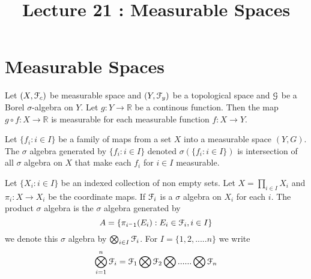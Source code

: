 \documentclass[a4paper,english,12pt]{article}
\title{Lecture 21 : Measurable Spaces}
\author{}
\begin{document}
\maketitle

\section{Measurable Spaces}
\begin{cor}
Let $(X,\mathcal{F}_c)$ be measurable space and $(Y,\mathcal{F}_y)$ be a topological space and $\mathcal{G}$ be a Borel $\sigma$-algebra on $Y$. Let $g : Y \longrightarrow \mathbb{R}$ be a continous function. Then the map $ g \circ f : X \longrightarrow \mathbb{R}$ is measurable for each measurable function $f : X \longrightarrow Y$.
\end{cor}
	
\begin{defn} %
Let $\{f_i : i \in I\}$ be a family of maps from a set $X$ into a measurable space $(Y,G)$. The $\sigma$ algebra generated by $\{f_i : i \in I\}$ denoted $\sigma(\{f_i : i \in I\})$ is intersection of all $\sigma$ algebra on $X$ that make each $f_i$ for $i \in I$ measurable.	
	
\end{defn}	

\begin{defn} %
	Let $\{X_i : i \in I\}$ be an indexed collection of non empty sets. Let $X = \prod_{i\in I} X_i$ and $\pi_i : X \longrightarrow X_i$ be the coordinate maps. If $\mathcal{F}_i$ is a $\sigma$ algebra on $X_i$ for each $i$. The product $\sigma$ algebra is the $\sigma$ algebra generated by  \[A= \{\pi_{i^-1}(E_i) : E_i \in \mathcal{F}_i , i \in I\}\]  we denote this $\sigma$ algebra by $\bigotimes_{i\in I} \mathcal{F}_i$. For $I = \{1,2,.....n\}$ we write \[\bigotimes_{i=1}^{n} \mathcal{F}_i = \mathcal{F}_1 \bigotimes \mathcal{F}_2 \bigotimes ...... \bigotimes \mathcal{F}_n\] 
\end{defn}
\end{document}
